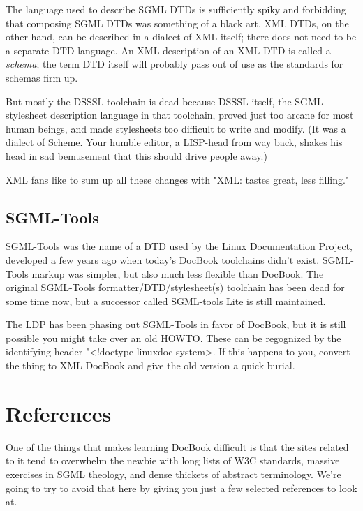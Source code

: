 \documentclass[pdftex,english,a4paper,10pt]{infocom}
\begin{document}
The language used to describe SGML DTDs is sufficiently spiky
and forbidding that composing SGML DTDs was something of a black art.
XML DTDs, on the other hand, can be described in a dialect of XML
itself; there does not need to be a separate DTD language. An XML
description of an XML DTD is called a
{\em schema};
the term DTD itself will probably pass out of use as the standards for
schemas firm up.

But mostly the DSSSL toolchain is dead because DSSSL itself, the
SGML stylesheet description language in that toolchain, proved just too
arcane for most human beings, and made stylesheets too difficult to
write and modify. (It was a dialect of Scheme.  Your humble editor, a
LISP-head from way back, shakes his head in sad bemusement that
this should drive people away.)

XML fans like to sum up all these changes with "XML: tastes great, less
filling."
\subsection{SGML-Tools}
\label{id2717333}\hypertarget{id2717333}{}%

SGML-Tools was the name of a DTD used by the \href{http://www.linuxdoc.org}{Linux Documentation Project},
developed a few years ago when today's DocBook toolchains didn't exist.
SGML-Tools markup was simpler, but also much less flexible than
DocBook.  The original SGML-Tools formatter/DTD/stylesheet(s)
toolchain has been dead for some time now, but a successor called \href{http://sourceforge.net/projects/sgmltools-lite/}{SGML-tools
Lite} is still maintained.

The LDP has been phasing out SGML-Tools in favor of DocBook, but
it is still possible you might take over an old HOWTO.  These can be
regognized by the identifying header "\textless{}!doctype linuxdoc
system\textgreater{}. If this happens to you, convert the thing to XML DocBook
and give the old version a quick burial.

\section{References}
\label{id2717368}\hypertarget{id2717368}{}%

One of the things that makes learning DocBook difficult is that
the sites related to it tend to overwhelm the newbie with long lists
of W3C standards, massive exercises in SGML theology, and dense
thickets of abstract terminology.  We're going to try to avoid that
here by giving you just a few selected references to look at.
\end{document}
